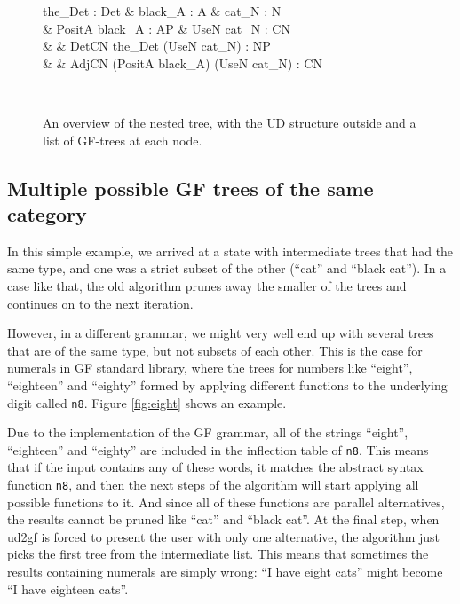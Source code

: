 \begin{figure}[H]
    \centering
    \setlength{\unitlength}{0.2mm}
    \begin{dependency}
        \begin{deptext}[column sep=0.4cm]
              the\_Det : Det \& black\_A : A \& cat\_N : N \\
            \& PositA black\_A : AP \& UseN cat\_N : CN \\
            \& \& DetCN the\_Det (UseN cat\_N) : NP \\
            \& \& AdjCN (PositA black\_A) (UseN cat\_N) : CN \\
        \end{deptext}
    \end{dependency} \\
    \caption{An overview of the nested tree, with the UD structure outside and a list of GF-trees at each node.}
    \label{fig:final_nested_compact}
\end{figure}

\subsection{Multiple possible GF trees of the same category}
\label{sec:multiple_trees}

In this simple example, we arrived at a state with intermediate trees that had the same type, and one was a strict subset of the other (``cat'' and ``black cat''). In a case like that, the old algorithm prunes away the smaller of the trees and continues on to the next iteration.

However, in a different grammar, we might very well end up with several trees that are of the same type, but not subsets of each other. This is the case for numerals in \ac{GF} standard library, where the trees for numbers like ``eight'', ``eighteen'' and ``eighty'' formed by applying different functions to the underlying digit called \texttt{n8}. Figure \ref{fig:eight} shows an example.

Due to the implementation of the \ac{GF} grammar, all of the strings ``eight'', ``eighteen'' and ``eighty'' are included in the inflection table of \texttt{n8}. This means that if the input contains any of these words, it matches the abstract syntax function \texttt{n8}, and then the next steps of the algorithm will start applying all possible functions to it. And since all of these functions are parallel alternatives, the results cannot be pruned like ``cat'' and ``black cat''. At the final step, when ud2gf is forced to present the user with only one alternative, the algorithm just picks the first tree from the intermediate list. This means that sometimes the results containing numerals are simply wrong: ``I have eight cats'' might become ``I have eighteen cats''.

